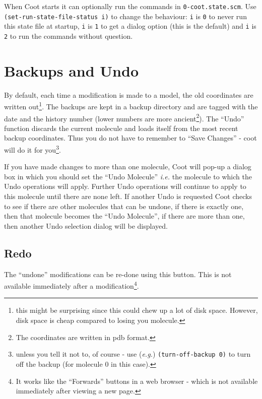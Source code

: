 \documentclass{book}
\begin{document}
When Coot starts it can optionally run the commands in
\texttt{0-coot.state.scm}.  Use \texttt{(set-run-state-file-status i)}
to change the behaviour: \texttt{i} is \texttt{0} to never run this
state file at startup, \texttt{i} is
\texttt{1} to get a dialog option (this is the default) and \texttt{i}
is \texttt{2} to run the commands without question.

\section{Backups and Undo}
\label{sec:backups_undo} By default, each 
time a modification is made to a model, the old coordinates are
written out\footnote{this might be surprising since this could chew up
  a lot of disk space.  However, disk space is cheap compared to
  losing you molecule.}.  The backups are kept in a backup directory
and are tagged with the date and the history number (lower numbers are
more ancient\footnote{The coordinates are written in pdb format.}).
The ``Undo'' function discards the current molecule and loads itself
from the most recent backup coordinates.  Thus you do not have to
remember to ``Save Changes'' - coot will do it for you\footnote{unless
  you tell it not to, of course - use (\emph{e.g.})
  \texttt{(turn-off-backup 0)} to turn off the backup (for molecule 0
  in this case).}.

If you have made changes to more than one molecule, Coot will pop-up a
dialog box in which you should set the ``Undo Molecule'' \emph{i.e.}
the molecule to which the Undo operations will apply.  Further Undo
operations will continue to apply to this molecule until there are
none left.  If another Undo is requested Coot checks to see if there
are other molecules that can be undone, if there is exactly one, then
that molecule becomes the ``Undo Molecule'', if there are more than
one, then another Undo selection dialog will be displayed.



\subsection{Redo}
The ``undone'' modifications can be re-done using this
button.  This is not available immediately after a
modification\footnote{It works like the ``Forwards'' buttons in a web
  browser - which is not available immediately after viewing a new
  page.}.
\end{document}

